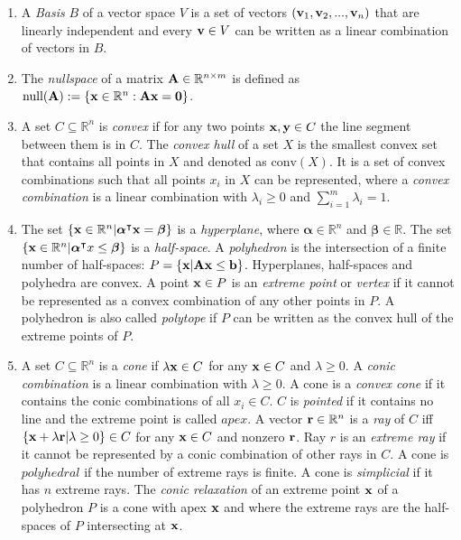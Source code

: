 \begin{enumerate}
    \item A \textit{Basis} $B$ of a vector space $V$ is a set of vectors $(\bold v_1, \bold v_2, ..., \bold v_n)$ that are linearly independent and every $\bold v \in V$ can be written as a linear combination of vectors in $B$.

    \item The \textit{nullspace} of a matrix $\bold A \in \mathbb{R}^{n \times m}$ is defined as $\text{null}(\bold A):=\{\bold x \in \mathbb{R}^n: \bold A \bold x = \bold 0\}$. 
    
    \item A set $C \subseteq \mathbb{R}^n$ is \textit{convex} if for any two points $\bold x, \bold y \in C$ the line segment between them is in $C$. %
    The \textit{convex hull} of a set $X$ is the smallest convex set that contains all points in $X$ and denoted as $\text{conv}(X)$. It is a set of convex combinations such that all points $x_i$ in $X$ can be represented, where a \textit{convex combination} is a linear combination with $\lambda_i \geq 0$ and $\sum_{i=1}^m \lambda_i = 1$.
    
    \item The set $\{\bold x \in \mathbb{R}^n | \boldsymbol \alpha^\intercal \bold x = \boldsymbol \beta \}$ is a \textit{hyperplane}, where $\boldsymbol \alpha \in \mathbb{R}^n$ and $\boldsymbol \beta \in \mathbb{R}$. The set $\{\bold x \in \mathbb{R}^n | \boldsymbol \alpha^\intercal x \leq \boldsymbol \beta \}$ is a \textit{half-space}. \cite{understanding_lp}
    A \textit{polyhedron} is the intersection of a finite number of half-spaces: $P = \{ \bold x | \bold A \bold x \leq \bold b\}$. Hyperplanes, half-spaces and polyhedra are convex. A point $\bold x \in P$ is an \textit{extreme point} or \textit{vertex} if it cannot be represented as a convex combination of any other points in $P$. %
    A polyhedron is also called \textit{polytope} if $P$ can be written as the convex hull of the extreme points of $P$. 
   
    \item A set $C \subseteq \mathbb{R}^n$ is a \textit{cone} if $\lambda \bold x \in C$ for any $\bold x \in C$ and $\lambda \geq 0$. A \textit{conic combination} is a linear combination with $\lambda \geq 0$. A cone is a \textit{convex cone} if it contains the conic combinations of all $x_i \in C$. $C$ is \textit{pointed} if it contains no line and the extreme point is called $apex$. A vector $\bold r \in \mathbb{R}^n$ is a \textit{ray} of $C$ iff $\{\bold x + \lambda \bold r | \lambda \geq 0 \} \in C$ for any $\bold x \in C$ and nonzero $\bold r$. Ray $r$ is an \textit{extreme ray} if it cannot be represented by a conic combination of other rays in $C$. 
    A cone is $polyhedral$ if the number of extreme rays is finite. A cone is \textit{simplicial} if it has $n$ extreme rays. 
    The \textit{conic relaxation} of an extreme point $\bold x$ of a polyhedron $P$ is a cone with apex $\bold x$ and where the extreme rays are the half-spaces of $P$ intersecting at $\bold x$.
    

\end{enumerate}
